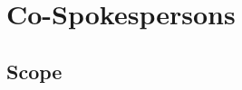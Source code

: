 \documentclass[12pt]{article}
\begin{document}
%





\section{Co-Spokespersons}
\label{sec:spokes}



\subsection{Scope}
\end{document}
